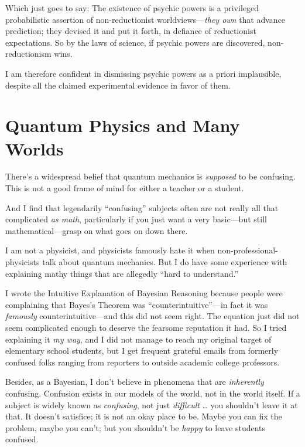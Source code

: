 {
 Which just goes to say: The existence of psychic powers is a
privileged probabilistic assertion of non-reductionist
worldviews---\textit{they own} that advance prediction; they devised it
and put it forth, in defiance of reductionist expectations. So by the
laws of science, if psychic powers are discovered, non-reductionism
wins.}

{
 I am therefore confident in dismissing psychic powers as a priori
implausible, despite all the claimed experimental evidence in favor of
them.}

\myendsectiontext

\chapter{Quantum Physics and Many Worlds}


{
 There's a widespread belief that quantum mechanics
is \textit{supposed} to be confusing. This is not a good frame of mind
for either a teacher or a student.}

{
 And I find that legendarily
``confusing'' subjects often are not
really all that complicated \textit{as math}, particularly if you just
want a very basic---but still mathematical---grasp on what goes on down
there.}

{
 I am not a physicist, and physicists famously hate it when
non-professional-physicists talk about quantum mechanics. But I do have
some experience with explaining mathy things that are allegedly
``hard to understand.''}

{
 I wrote the Intuitive Explanation of Bayesian Reasoning because
people were complaining that Bayes's Theorem was
``counterintuitive''---in fact it
was \textit{famously} counterintuitive---and this did not seem right.
The equation just did not seem complicated enough to deserve the
fearsome reputation it had. So I tried explaining it \textit{my way},
and I did not manage to reach my original target of elementary school
students, but I get frequent grateful emails from formerly confused
folks ranging from reporters to outside academic college professors.}

{
 Besides, as a Bayesian, I don't believe in
phenomena that are \textit{inherently} confusing. Confusion exists in
our models of the world, not in the world itself. If a subject is
widely known as \textit{confusing}, not just \textit{difficult} \ldots
you shouldn't leave it at that. It
doesn't satisfice; it is not an okay place to be. Maybe
you can fix the problem, maybe you can't; but you
shouldn't be \textit{happy} to leave students
confused.}

